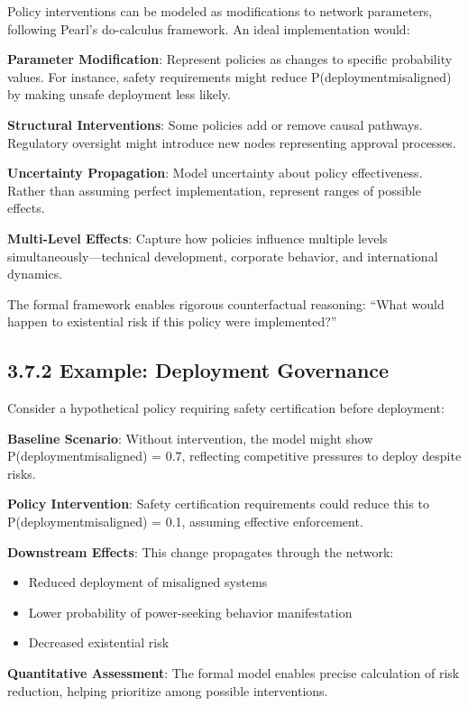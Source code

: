 \documentclass[
  11pt,
  letterpaper,
]{book}
\providecommand{\tightlist}{%
  \setlength{\itemsep}{0pt}\setlength{\parskip}{0pt}}
\begin{document}
Policy interventions can be modeled as modifications to network
parameters, following Pearl's do-calculus framework. An ideal
implementation would:

\textbf{Parameter Modification}: Represent policies as changes to
specific probability values. For instance, safety requirements might
reduce P(deployment\textbar misaligned) by making unsafe deployment less
likely.

\textbf{Structural Interventions}: Some policies add or remove causal
pathways. Regulatory oversight might introduce new nodes representing
approval processes.

\textbf{Uncertainty Propagation}: Model uncertainty about policy
effectiveness. Rather than assuming perfect implementation, represent
ranges of possible effects.

\textbf{Multi-Level Effects}: Capture how policies influence multiple
levels simultaneously---technical development, corporate behavior, and
international dynamics.

The formal framework enables rigorous counterfactual reasoning: ``What
would happen to existential risk if this policy were implemented?''

\subsection{3.7.2 Example: Deployment
Governance}\label{sec-deployment-example}

Consider a hypothetical policy requiring safety certification before
deployment:

\textbf{Baseline Scenario}: Without intervention, the model might show
P(deployment\textbar misaligned) = 0.7, reflecting competitive pressures
to deploy despite risks.

\textbf{Policy Intervention}: Safety certification requirements could
reduce this to P(deployment\textbar misaligned) = 0.1, assuming
effective enforcement.

\textbf{Downstream Effects}: This change propagates through the network:

\begin{itemize}
\tightlist
\item
  Reduced deployment of misaligned systems
\item
  Lower probability of power-seeking behavior manifestation
\item
  Decreased existential risk
\end{itemize}

\textbf{Quantitative Assessment}: The formal model enables precise
calculation of risk reduction, helping prioritize among possible
interventions.
\end{document}
